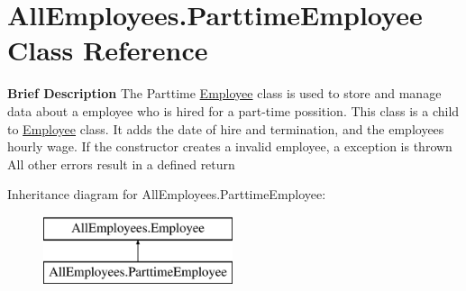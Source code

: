 \hypertarget{class_all_employees_1_1_parttime_employee}{}\section{All\+Employees.\+Parttime\+Employee Class Reference}
\label{class_all_employees_1_1_parttime_employee}


{\bfseries Brief Description} The Parttime \hyperlink{class_all_employees_1_1_employee}{Employee} class is used to store and manage data about a employee who is hired for a part-\/time possition. This class is a child to \hyperlink{class_all_employees_1_1_employee}{Employee} class. It adds the date of hire and termination, and the employees hourly wage. If the constructor creates a invalid employee, a exception is thrown All other errors result in a defined return  


Inheritance diagram for All\+Employees.\+Parttime\+Employee\+:\begin{figure}[H]
\begin{center}
\leavevmode
\includegraphics[height=2.000000cm]{class_all_employees_1_1_parttime_employee}
\end{center}
\end{figure}
